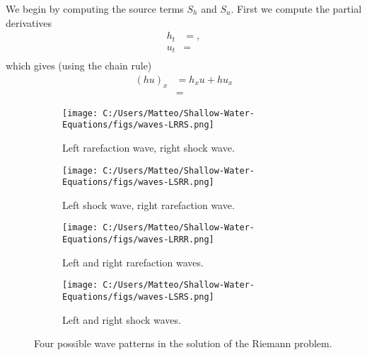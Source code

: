 We begin by computing the source terms $S_h$ and $S_u$.
First we compute the partial derivatives
\begin{align*}
    h_t &= ,\\
    u_t &=  \\
\end{align*}
which gives (using the chain rule)
\begin{align*}
    {(hu)}_x &= h_x u + h u_x \\
    &= 
\end{align*}



\begin{figure}[htbp]
    \centering
    \begin{subfigure}[b]{0.4\textwidth}
        \centering
        \texttt{[image: C:/Users/Matteo/Shallow-Water-Equations/figs/waves-LRRS.png]}
        \caption{Left rarefaction wave, right shock wave.}\label{fig:waves-LRRS}
    \end{subfigure}
    \hspace{0.02\textwidth} %
    \begin{subfigure}[b]{0.4\textwidth}
        \centering
        \texttt{[image: C:/Users/Matteo/Shallow-Water-Equations/figs/waves-LSRR.png]}
        \caption{Left shock wave, right rarefaction wave.}\label{fig:waves-LSRR}
    \end{subfigure}
    
    \begin{subfigure}[b]{0.4\textwidth}
        \centering
        \texttt{[image: C:/Users/Matteo/Shallow-Water-Equations/figs/waves-LRRR.png]}
        \caption{Left and right rarefaction waves.}\label{fig:waves-LRRR}
    \end{subfigure}
    \hspace{0.02\textwidth} %
    \begin{subfigure}[b]{0.4\textwidth}
        \centering
        \texttt{[image: C:/Users/Matteo/Shallow-Water-Equations/figs/waves-LSRS.png]}
        \caption{Left and right shock waves.}\label{fig:waves-LSRS}
    \end{subfigure}
    \caption{Four possible wave patterns in the solution of the Riemann problem.}\label{fig:wave-patterns}
\end{figure}


